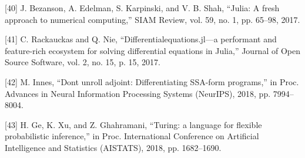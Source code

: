 \documentclass[letterpaper, 10pt, journal, twoside]{IEEEtran}
\begin{document}
{[}40{]} J. Bezanson, A. Edelman, S. Karpinski, and V. B. Shah, ``Julia:
A fresh approach to numerical computing,'' SIAM Review, vol. 59, no. 1,
pp. 65--98, 2017.

{[}41{]} C. Rackauckas and Q. Nie, ``Differentialequations.jl---a
performant and feature-rich ecosystem for solving differential equations
in Julia,'' Journal of Open Source Software, vol. 2, no. 15, p. 15,
2017.

{[}42{]} M. Innes, ``Don\textquotesingle t unroll adjoint:
Differentiating SSA-form programs,'' in Proc. Advances in Neural
Information Processing Systems (NeurIPS), 2018, pp. 7994--8004.

{[}43{]} H. Ge, K. Xu, and Z. Ghahramani, ``Turing: a language for
flexible probabilistic inference,'' in Proc. International Conference on
Artificial Intelligence and Statistics (AISTATS), 2018, pp. 1682--1690.
\end{document}
